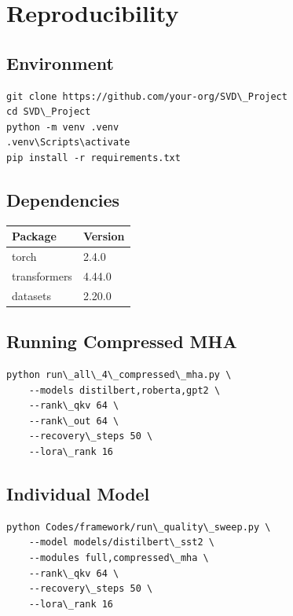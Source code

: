 \section{Reproducibility}

\subsection{Environment}

\begin{lstlisting}
git clone https://github.com/your-org/SVD\_Project
cd SVD\_Project
python -m venv .venv
.venv\Scripts\activate
pip install -r requirements.txt
\end{lstlisting}

\subsection{Dependencies}

\begin{table}[H]
\centering
\small
\begin{tabular}{ll}
\toprule
\textbf{Package} & \textbf{Version} \\
\midrule
torch & 2.4.0 \\
transformers & 4.44.0 \\
datasets & 2.20.0 \\
\bottomrule
\end{tabular}
\end{table}

\subsection{Running Compressed MHA}

\begin{lstlisting}
python run\_all\_4\_compressed\_mha.py \
    --models distilbert,roberta,gpt2 \
    --rank\_qkv 64 \
    --rank\_out 64 \
    --recovery\_steps 50 \
    --lora\_rank 16
\end{lstlisting}

\subsection{Individual Model}

\begin{lstlisting}
python Codes/framework/run\_quality\_sweep.py \
    --model models/distilbert\_sst2 \
    --modules full,compressed\_mha \
    --rank\_qkv 64 \
    --recovery\_steps 50 \
    --lora\_rank 16
\end{lstlisting}

